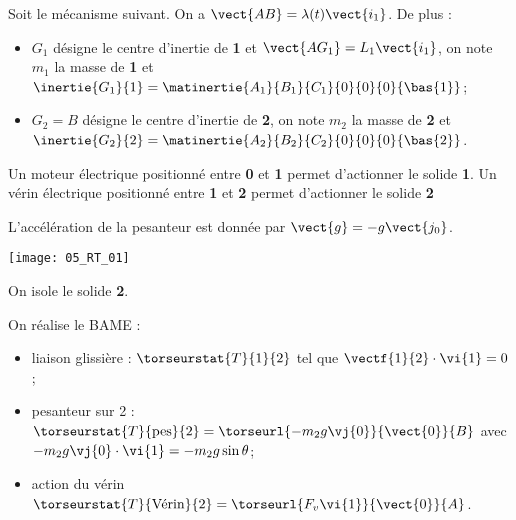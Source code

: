 \normaltrue
\correctiontrue


\setcounter{question}{0}
\ifcorrection
\else
{}
\fi

\ifprof
\else
Soit le mécanisme suivant. On a $\vect{AB}=\lambda(t)\vect{i_1}$. De plus :
\begin{itemize}
\item $G_1$ désigne le centre d'inertie de \textbf{1} et $\vect{AG_1}=L_1\vect{i_1}$, on note $m_1$ la masse de \textbf{1} et $\inertie{G_1}{1}=\matinertie{A_1}{B_1}{C_1}{0}{0}{0}{\bas{1}}$; 
\item $G_2=B$ désigne le centre d'inertie de \textbf{2}, on note $m_2$ la masse de \textbf{2} et $\inertie{G_2}{2}=\matinertie{A_2}{B_2}{C_2}{0}{0}{0}{\bas{2}}$.
\end{itemize}


Un moteur électrique positionné entre \textbf{0} et \textbf{1} permet d'actionner le solide \textbf{1}.
Un vérin électrique positionné entre \textbf{1} et \textbf{2} permet d'actionner le solide \textbf{2}

L'accélération de la pesanteur est donnée par $\vect{g}=-g\vect{j_0}$.

\begin{center}
\texttt{[image: 05\_RT\_01]}
\end{center}
\fi

\ifprof

On isole le solide \textbf{2}.

On réalise le BAME : 
\begin{itemize}
\item liaison glissière : $\torseurstat{T}{1}{2}$ tel que $\vectf{1}{2}\cdot\vi{1} = 0$;
\item pesanteur sur 2 : $\torseurstat{T}{\text{pes}}{2} = \torseurl{-m_2 g \vj{0}}{\vect{0}}{B}$ avec $-m_2 g \vj{0} \cdot \vi{1} = -m_2 g\sin \theta$;
\item action du vérin $\torseurstat{T}{\text{Vérin}}{2} =  \torseurl{F_v \vi{1}}{\vect{0}}{A}$.
\end{itemize}

